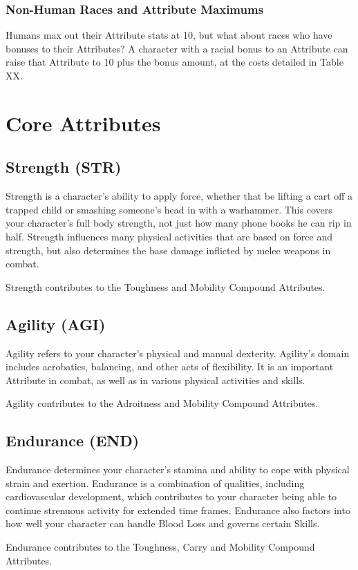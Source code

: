 \documentclass[oneside,11pt,english]{book}
\begin{document}
\subsubsection{Non-Human Races and Attribute Maximums}
Humans max out their Attribute stats at 10, but what about races who have bonuses to their Attributes? A 
character with a racial bonus to an Attribute can raise that Attribute to 10 plus the bonus amount, at the 
costs detailed in Table XX. 
\section{Core Attributes}
\subsection*{Strength (STR)}
Strength is a character's ability to apply force, whether that be lifting a cart off a trapped child or 
smashing someone's head in with a warhammer. This covers your character’s full body strength, not just 
how many phone books he can rip in half. Strength influences many physical activities that are based on 
force and strength, but also determines the base damage inflicted by melee weapons in combat. 


Strength contributes to the Toughness and Mobility Compound Attributes.
\subsection*{Agility (AGI)} 
Agility refers to your character’s physical and manual dexterity. Agility’s domain includes acrobatics, 
balancing, and other acts of flexibility. It is an important Attribute in combat, as well as in various 
physical activities and skills. 


Agility contributes to the Adroitness and Mobility Compound Attributes. 
\subsection*{Endurance (END)}
Endurance determines your character’s stamina and ability to cope with physical strain and exertion. 
Endurance is a combination of qualities, including cardiovascular development, which contributes to your 
character being able to continue strenuous activity for extended time frames. Endurance also factors into 
how well your character can handle Blood Loss and governs certain Skills. 

Endurance contributes to the Toughness, Carry and Mobility Compound Attributes. 
\end{document}
